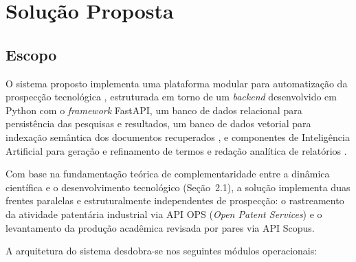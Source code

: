 \documentclass[12pt, a4paper]{article}
\begin{document}
\section{Solução Proposta}

  \subsection{Escopo}

  O sistema proposto implementa uma plataforma modular para automatização da
prospecção tecnológica \cite{mayerhoff2008, porter2004}, estruturada em torno de
um \textit{backend} desenvolvido em Python com o \textit{framework} FastAPI, um
banco de dados relacional para persistência das pesquisas e resultados, um banco
de dados vetorial para indexação semântica dos documentos recuperados
\cite{gao2024}, e componentes de Inteligência Artificial para geração e refinamento
de termos e redação analítica de relatórios \cite{zhao2023}.

  Com base na fundamentação teórica de complementaridade entre a dinâmica científica e o desenvolvimento tecnológico (Seção~2.1), a solução implementa duas frentes paralelas e estruturalmente independentes de prospecção: o rastreamento da atividade patentária industrial via API OPS (\textit{Open Patent Services}) e o levantamento da produção acadêmica revisada por pares via API Scopus.

  A arquitetura do sistema desdobra-se nos seguintes módulos operacionais:
\end{document}
